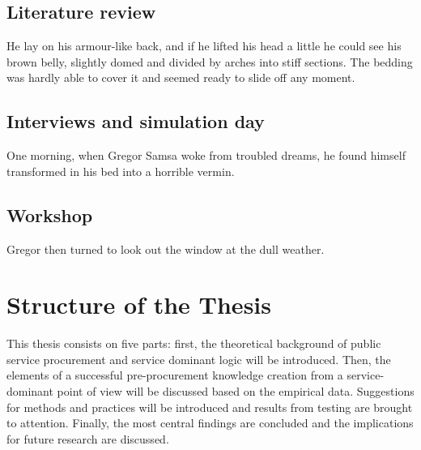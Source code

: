\documentclass[12pt,a4paper,oneside,pdftex]{report}
\begin{document}
\subsection{Literature review}
He lay on his armour-like back, and if he lifted his head a little he could see his brown belly, slightly domed and divided by arches into stiff sections. The bedding was hardly able to cover it and seemed ready to slide off any moment.

\subsection{Interviews and simulation day}
One morning, when Gregor Samsa woke from troubled dreams, he found himself transformed in his bed into a horrible vermin. 

\subsection{Workshop}
Gregor then turned to look out the window at the dull weather.


\section{Structure of the Thesis}
\label{section:structure}

This thesis consists on five parts: first, the theoretical background of public service procurement and service dominant logic will be introduced. Then, the elements of a successful pre-procurement knowledge creation from a service-dominant point of view will be discussed based on the empirical data. Suggestions for methods and practices will be introduced and results from testing are brought to attention. Finally, the most central findings are concluded and the implications for future research are discussed. 

\end{document}
